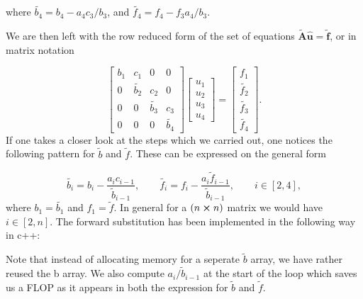 \documentclass[a4paper,10pt]{article}
\begin{document}
where $\tilde{b_4} = b_4 - a_4c_3/b_3$, and $\tilde{f_4} = f_4 - f_3a_4/b_3$. 

\newpage

We are then left with the row reduced form of the set of equations $\tilde{\mathbf{A}}\mathbf{\hat{u}} = \tilde{\mathbf{f}}$, or in matrix notation

\begin{equation}\label{eq:7}
\begin{bmatrix}
b_1 & c_1 & 0 & 0 \\
0& \tilde{b_2}  & c_2 & 0 \\
0 & 0 & \tilde{b_3} & c_3 \\
0 & 0 & 0 & \tilde{b_4} 
\end{bmatrix} \begin{bmatrix}
u_1\\
u_2\\
u_3\\
u_4
\end{bmatrix} = \begin{bmatrix}
f_1\\
\tilde{f_2}\\
\tilde{f_3}\\
\tilde{f_4}
\end{bmatrix}.
\end{equation}
If one takes a closer look at the steps which we carried out, one notices the following pattern for $\tilde{b}$ and $\tilde{f}$. These can be expressed on the general form

\begin{equation}\label{eq:8}
\tilde{b_i} = b_i - \frac{a_i c_{i-1}}{\tilde{b}_{i-1}}, \qquad 
\tilde{f_i} = f_i - \frac{a_i \tilde{f}_{i-1}}{\tilde{b}_{i-1}}, \qquad i \in [2,4],
\end{equation}
where $b_1 = \tilde{b_1}$ and $f_1 = \tilde{f}$. In general for a $(n \cross n)$ matrix we would have $i \in [2,n]$. 
The forward substitution has been implemented in the following way in c++:


Note that instead of allocating memory for a seperate $\tilde{b}$ array, we have rather reused the b array. We also compute $a_i / \tilde{b}_{i-1}$ at the start of the loop which saves us a FLOP as it appears in both the expression for $\tilde{b}$ and $\tilde{f}$.
\end{document}
